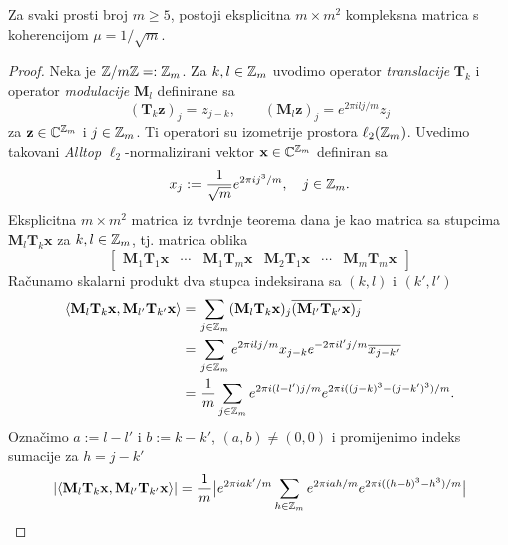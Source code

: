 \documentclass[a4paper,twoside,12pt]{memoir} %
\newcommand{\vect}[1]{\mathbf{#1}}
\renewcommand{\vec}{\vect}
\begin{document}
\begin{thm}\label{tm:5:13}
    Za svaki prosti broj $m \geq 5$, postoji eksplicitna $m \times m^2$ kompleksna matrica s koherencijom $\mu = 1/\sqrt{m}$.
\end{thm}
\begin{proof}
    Neka je $\mathbb{Z} / m \mathbb{Z} =: \mathbb{Z}_m$. Za $k,l \in \mathbb{Z}_m$ uvodimo operator \textit{translacije} $\vec T_k$ i operator \textit{modulacije} $\vec M_l$ definirane sa
    \begin{equation*}
        (\vec T_k \vec z)_j  = z_{j-k}, \quad \quad (\vec M_l \vec z)_j = e^{2 \pi i l j / m}z_j 
    \end{equation*}
    za $\vec z \in \C^{\Z_m}$ i $j \in \mathbb{Z}_m$. Ti operatori su izometrije prostora $\ell_2(\mathbb{Z}_m)$. Uvedimo takovani \textit{Alltop} $\ell_2$-normalizirani vektor $\vec x \in \C^{\Z_m}$ definiran sa
    \begin{equation*}
        x_j := \frac{1}{\sqrt{m}}e^{2\pi i j^3/m}, \quad j \in \mathbb{Z}_m .
    \end{equation*}
    Eksplicitna $m \times m^2$ matrica iz tvrdnje teorema dana je kao matrica sa stupcima $\vec M_l \vec T_k \vec x$ za $k,l \in \mathbb{Z}_m$, tj. matrica oblika
    \begin{equation*}
        \begin{bmatrix*}
            \vec M_1 \vec T_1 \vec x & \cdots & \vec M_1 \vec T_m \vec x & \vec M_2 \vec T_1 \vec x & \cdots & \vec M_m \vec T_m \vec x 
        \end{bmatrix*} 
    \end{equation*}
    Ra\v{c}unamo skalarni produkt dva stupca indeksirana sa $(k,l)$ i $(k', l')$
    \begin{align*}
        \langle \vec M_l \vec T_k \vec x, \vec M_{l'} \vec T_{k'} \vec x \rangle &= \sum_{j \in \Z_m} (\vec M_{l} \vec T_{k} \vec x)_j \overline{(\vec M_{l'} \vec T_{k'} \vec x)_j} \\
        &= \sum_{j \in \Z_m} e^{2 \pi ilj/m}x_{j-k} e^{-2 \pi il'j/m}\overline{x_{j-k'}}\\ 
        &= \frac{1}{m} \sum_{j \in \Z_m} e^{2 \pi i(l-l')j/m} e^{2 \pi i((j-k)^3 - (j - k')^3)/m}.
    \end{align*}
    Ozna\v{c}imo $a := l - l'$ i $b := k - k'$, $(a,b) \neq (0,0)$ i promijenimo indeks sumacije za $h = j - k'$
    \begin{align*}
        |\langle \vec M_l \vec T_k \vec x, \vec M_{l'} \vec T_{k'} \vec x \rangle| &= \frac{1}{m} \big |   e^{2 \pi iak'/m}  \sum_{h \in \Z_m} e^{2 \pi iah/m}e^{2 \pi i ((h-b)^3 - h^3)/m}  \big | \\

\end{align*}
\end{proof}
\end{document}

